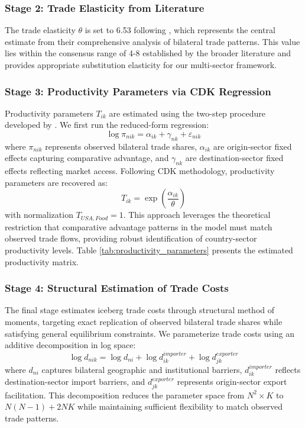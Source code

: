 \subsubsection{Stage 2: Trade Elasticity from Literature}

The trade elasticity $\theta$ is set to 6.53 following \cite{costinot2012TheReviewofEconomicStudies}, which represents the central estimate from their comprehensive analysis of bilateral trade patterns. This value lies within the consensus range of 4-8 established by the broader literature \citep{eaton2002Econometrica} and provides appropriate substitution elasticity for our multi-sector framework.

\subsubsection{Stage 3: Productivity Parameters via CDK Regression}

Productivity parameters $T_{ik}$ are estimated using the two-step procedure developed by \cite{costinot2012TheReviewofEconomicStudies}. We first run the reduced-form regression:
\begin{equation}
\log \pi_{nik} = \alpha_{ik} + \gamma_{nk} + \varepsilon_{nik}
\end{equation}
where $\pi_{nik}$ represents observed bilateral trade shares, $\alpha_{ik}$ are origin-sector fixed effects capturing comparative advantage, and $\gamma_{nk}$ are destination-sector fixed effects reflecting market access. Following CDK methodology, productivity parameters are recovered as:
\begin{equation}
 T_{ik} = \exp\left(\frac{\hat{\alpha}_{ik}}{\theta}\right)
\end{equation}
with normalization $T_{USA,Food} = 1$. This approach leverages the theoretical restriction that comparative advantage patterns in the model must match observed trade flows, providing robust identification of country-sector productivity levels. Table \ref{tab:productivity_parameters} presents the estimated productivity matrix.

\subsubsection{Stage 4: Structural Estimation of Trade Costs}

The final stage estimates iceberg trade costs through structural method of moments, targeting exact replication of observed bilateral trade shares while satisfying general equilibrium constraints. We parameterize trade costs using an additive decomposition in log space:
\begin{equation}
\log d_{nik} = \log d_{ni} + \log d_{ik}^{importer} + \log d_{jk}^{exporter}
\end{equation}
where $d_{ni}$ captures bilateral geographic and institutional barriers, $d_{ik}^{importer}$ reflects destination-sector import barriers, and $d_{jk}^{exporter}$ represents origin-sector export facilitation. This decomposition reduces the parameter space from $N^2 \times K$ to $N(N-1) + 2NK$ while maintaining sufficient flexibility to match observed trade patterns.

